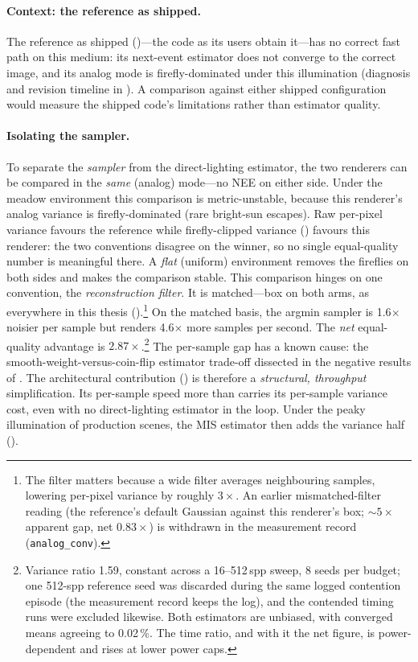 \paragraph{Context: the reference as shipped.} The reference as shipped
()---the code as its users obtain it---has no correct fast path on this
medium: its next-event estimator does not converge to the correct image, and its analog mode is
firefly-dominated under this illumination (diagnosis and revision timeline in
). A comparison against either shipped configuration would measure the
shipped code's limitations rather than estimator quality.

\paragraph{Isolating the sampler.} To separate the \emph{sampler} from the direct-lighting estimator,
the two renderers can be compared in the \emph{same} (analog) mode---no NEE on either side. Under the
meadow environment this comparison is metric-unstable, because this renderer's analog variance is
firefly-dominated (rare bright-sun escapes). Raw per-pixel variance favours the reference while
firefly-clipped variance () favours this renderer: the two conventions disagree
on the winner, so no single equal-quality number is meaningful there. A
\emph{flat} (uniform) environment removes the fireflies on both sides and makes the comparison stable.
This comparison hinges on one convention, the \emph{reconstruction filter}. It is
matched---box on both arms, as everywhere in this
thesis ().\footnote{The filter matters because a wide filter averages neighbouring samples, lowering
per-pixel variance by roughly $3\times$. An earlier mismatched-filter reading (the
reference's default Gaussian against this renderer's box; ${\sim}5\times$ apparent gap,
net $0.83\times$) is withdrawn in the measurement record (\texttt{analog\_conv}).} On the matched
basis, the argmin sampler is \num{1.6}$\times$ noisier per sample but renders \num{4.6}$\times$
more samples per second. The \emph{net} equal-quality advantage is $\mathbf{\num{2.87}\times}$.\footnote{Variance
ratio \num{1.59}, constant across a \numrange{16}{512}\,spp sweep, \num{8} seeds per budget; one \num{512}-spp reference seed was discarded during the same logged contention episode
(the measurement record keeps the log), and the contended timing runs were excluded
likewise. Both
estimators are unbiased, with converged means agreeing to
\num{0.02}\,\%. The time ratio, and with it the net figure, is power-dependent and rises at lower
power caps.} The per-sample gap has a known cause: the smooth-weight-versus-coin-flip
estimator trade-off dissected
in the negative results of . The architectural contribution
() is therefore a \emph{structural, throughput} simplification. Its
per-sample speed more than carries its per-sample variance cost, even with no direct-lighting
estimator in the loop. Under the peaky illumination of production scenes, the MIS estimator then
adds the variance half ().

